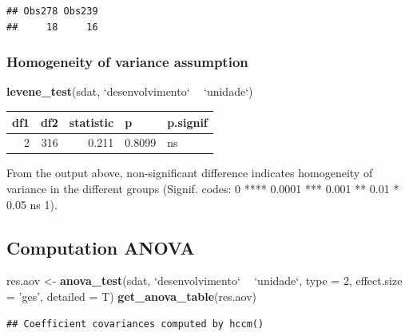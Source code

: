 \documentclass[]{article}
\newenvironment{Shaded}{\begin{snugshade}}{\end{snugshade}}
\newcommand{\DataTypeTok}[1]{\textcolor[rgb]{0.13,0.29,0.53}{#1}}
\newcommand{\DecValTok}[1]{\textcolor[rgb]{0.00,0.00,0.81}{#1}}
\newcommand{\KeywordTok}[1]{\textcolor[rgb]{0.13,0.29,0.53}{\textbf{#1}}}
\newcommand{\NormalTok}[1]{#1}
\newcommand{\OperatorTok}[1]{\textcolor[rgb]{0.81,0.36,0.00}{\textbf{#1}}}
\newcommand{\StringTok}[1]{\textcolor[rgb]{0.31,0.60,0.02}{#1}}
\begin{document}
\begin{verbatim}
## Obs278 Obs239 
##     18     16
\end{verbatim}

\hypertarget{homogeneity-of-variance-assumption}{%
\subsubsection{Homogeneity of variance
assumption}\label{homogeneity-of-variance-assumption}}

\begin{Shaded}
\begin{Highlighting}[]
\KeywordTok{levene_test}\NormalTok{(sdat, }\StringTok{`}\DataTypeTok{desenvolvimento}\StringTok{`} \OperatorTok{~}\StringTok{ `}\DataTypeTok{unidade}\StringTok{`}\NormalTok{)}
\end{Highlighting}
\end{Shaded}

\begin{longtable}[]{@{}rrrll@{}}
\toprule
df1 & df2 & statistic & p & p.signif\tabularnewline
\midrule
\endhead
2 & 316 & 0.211 & 0.8099 & ns\tabularnewline
\bottomrule
\end{longtable}

From the output above, non-significant difference indicates homogeneity
of variance in the different groups (Signif. codes: 0 **** 0.0001 ***
0.001 ** 0.01 * 0.05 ns 1).

\hypertarget{computation-anova}{%
\subsection{Computation ANOVA}\label{computation-anova}}

\begin{Shaded}
\begin{Highlighting}[]
\NormalTok{res.aov <-}\StringTok{ }\KeywordTok{anova_test}\NormalTok{(sdat, }\StringTok{`}\DataTypeTok{desenvolvimento}\StringTok{`} \OperatorTok{~}\StringTok{ `}\DataTypeTok{unidade}\StringTok{`}\NormalTok{, }\DataTypeTok{type =} \DecValTok{2}\NormalTok{, }\DataTypeTok{effect.size =} \StringTok{'ges'}\NormalTok{, }\DataTypeTok{detailed =}\NormalTok{ T)}
\KeywordTok{get_anova_table}\NormalTok{(res.aov)}
\end{Highlighting}
\end{Shaded}

\begin{verbatim}
## Coefficient covariances computed by hccm()
\end{verbatim}
\end{document}
